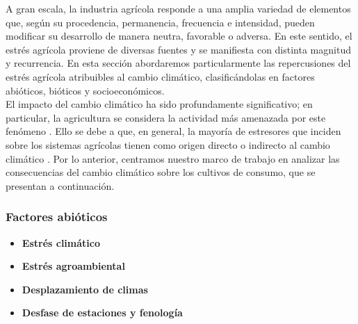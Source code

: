 A gran escala, la industria agrícola responde a una amplia variedad de elementos que, según su procedencia, permanencia, frecuencia e intensidad, pueden modificar su desarrollo de manera neutra, favorable o adversa. En este sentido, el estrés agrícola proviene de diversas fuentes y se manifiesta con distinta magnitud y recurrencia. En esta sección abordaremos particularmente las repercusiones del estrés agrícola atribuibles al cambio climático, clasificándolas en factores abióticos, bióticos y socioeconómicos.\\

El impacto del cambio climático ha sido profundamente significativo; en particular, la agricultura se considera la actividad más amenazada por este fenómeno \cite{Boyer_1982, Raza_2019}. Ello se debe a que, en general, la mayoría de estresores que inciden sobre los sistemas agrícolas tienen como origen directo o indirecto al cambio climático \cite{Olschewski_2024, Raza_2019, Surowka_2020}. Por lo anterior, centramos nuestro marco de trabajo en analizar las consecuencias del cambio climático sobre los cultivos de consumo, que se presentan a continuación.

\subsubsection{Factores abióticos}
\begin{itemize}[leftmargin=0cm, itemsep=0.5 cm]
\item[]\textbf{Estrés climático\\}
\item[]\textbf{Estrés agroambiental\\}
\item[]\textbf{Desplazamiento de climas\\}
\item[]\textbf{Desfase de estaciones y fenología\\}
\end{itemize}

